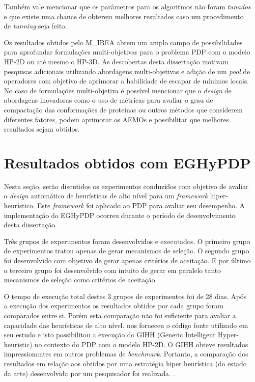 Também vale mencionar que os parâmetros para os algoritmos não foram \textit{tunados} e que existe uma chance de obterem melhores resultados caso um procedimento de \textit{tunning} seja feito.

Os resultados obtidos pelo M\_IBEA abrem um amplo campo de possibilidades para aprofundar formulações multi-objetivas para o problema PDP com o modelo HP-2D ou até mesmo o HP-3D. As descobertas desta dissertação motivam pesquisas adicionais utilizando abordagens multi-objetivas e adição de um \textit{pool} de operadores com objetivo de aprimorar a habilidade de escapar de mínimos locais. No caso de formulações multi-objetiva é possível mencionar que o \textit{design} de abordagens inovadoras como o uso de métricas para avaliar o grau de compactação das conformações de proteínas ou outros métodos que considerem diferentes fatores, podem aprimorar os AEMOs e possibilitar que melhores resultados sejam obtidos.



\section{Resultados obtidos com EGHyPDP}

Nesta seção, serão discutidos  os experimentos conduzidos com objetivo de avaliar o \textit{design} automático de heurísticas de alto nível para um \textit{framework} hiper-heurístico. Este \textit{framework} foi aplicado ao PDP para avaliar seu desempenho. A implementação do EGHyPDP ocorreu durante o período de desenvolvimento desta dissertação. 


Três grupos de experimentos foram desenvolvidos e executados. O primeiro grupo de experimentos tratou apenas de gerar mecanismos de seleção. O segundo grupo foi desenvolvido com objetivo de gerar apenas critérios de aceitação. E por último o terceiro grupo foi desenvolvido com intuito de gerar em paralelo tanto mecanismos de seleção como critérios de aceitação.

O tempo de execução total destes 3 grupos de experimentos foi de 28 dias. Após a execução dos experimentos os resultados obtidos por cada grupo foram comparados entre si. Porém esta comparação não foi suficiente para avaliar a capacidade das heurísticas de alto nível. \cite{misir2012intelligent} nos forneceu o código fonte utilizado em seu estudo e isto possibilitou a execução do GIHH (Generic Intelligent Hyper-heuristic) no contexto do PDP com o modelo HP-2D. O GIHH obteve resultados impressionantes em outros problemas de \textit{benchmark}. Portanto, a comparação dos resultados em relação aos obtidos por uma estratégia hiper heurística (do estado da arte) desenvolvida por um pesquisador foi realizada.   	. 

